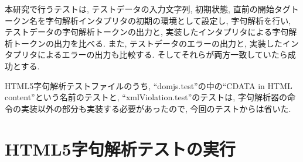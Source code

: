 \documentclass[uplatex,a4j]{jsreport}
\begin{document}
本研究で行うテストは, テストデータの入力文字列, 初期状態, 直前の開始タグトークン名を字句解析インタプリタの初期の環境として設定し, 
字句解析を行い, 
テストデータの字句解析トークンの出力と, 実装したインタプリタによる字句解析トークンの出力を比べる. 
また, テストデータのエラーの出力と, 実装したインタプリタによるエラーの出力も比較する. 
そしてそれらが両方一致していたら成功とする. 

HTML5字句解析テストファイルのうち, ``domjs.test''の中の``CDATA in HTML content''という名前のテストと, ``xmlViolation.test''のテストは, 字句解析器の命令の実装以外の部分も実装する必要があったので, 今回のテストからは省いた. 

\section{HTML5字句解析テストの実行}
\end{document}
